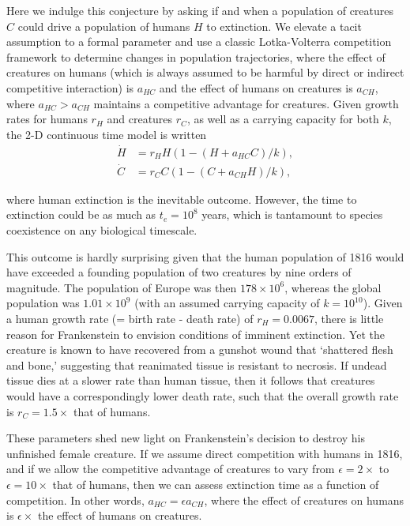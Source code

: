\documentclass{article}[10pt]
\begin{document}
Here we indulge this conjecture by asking if and when a population of creatures $C$ could drive a population of humans $H$ to extinction.
We elevate a tacit assumption to a formal parameter  and use a classic Lotka-Volterra competition framework to determine changes in population trajectories, where the effect of creatures on humans (which is always assumed to be harmful by direct or indirect competitive interaction) is $a_{HC}$ and the effect of humans on creatures is $a_{CH}$, where $a_{HC} > a_{CH}$ maintains a competitive advantage for creatures.
Given growth rates for humans $r_H$ and creatures $r_C$, as well as a carrying capacity for both $k$, the 2-D continuous time model is written
\vspace{-1mm}
\begin{align}
\dot{H}&=r_H H\left(1 - (H + a_{HC} C)/k\right), \\ \nonumber	
\dot{C}&=r_C C\left(1 - (C + a_{CH} H)/k\right),
\end{align}

\noindent where human extinction is the inevitable outcome.
However, the time to extinction could be as much as $t_e=10^8$ years, which is tantamount to species coexistence on any biological timescale.

This outcome is hardly surprising given that the human population of 1816 would have exceeded a founding population of two creatures by nine orders of magnitude.
The population of Europe was then $178\times 10^6$, whereas the global population was $1.01\times 10^9$ (with an assumed carrying capacity of $k=10^{10}$).
Given a human growth rate (= birth rate - death rate) of $r_H=0.0067$, there is little reason for Frankenstein to envision conditions of imminent extinction. 
Yet the creature is known to have recovered from a gunshot wound that `shattered flesh and bone,' suggesting that reanimated tissue is resistant to necrosis. 
If undead tissue dies at a slower rate than human tissue, then it follows that creatures would have a correspondingly lower death rate, such that the overall growth rate is $r_C=1.5\times$ that of humans.


These parameters shed new light on Frankenstein's decision to destroy his unfinished female creature.
If we assume direct competition with humans in 1816, and if we allow the competitive advantage of creatures to vary from $\epsilon=2\times$ to $\epsilon=10\times$ that of humans, then we can assess extinction time as a function of competition.
In other words, $a_{HC} = \epsilon a_{CH}$, where the effect of creatures on humans is $\epsilon \times$ the effect of humans on creatures.
\end{document}
